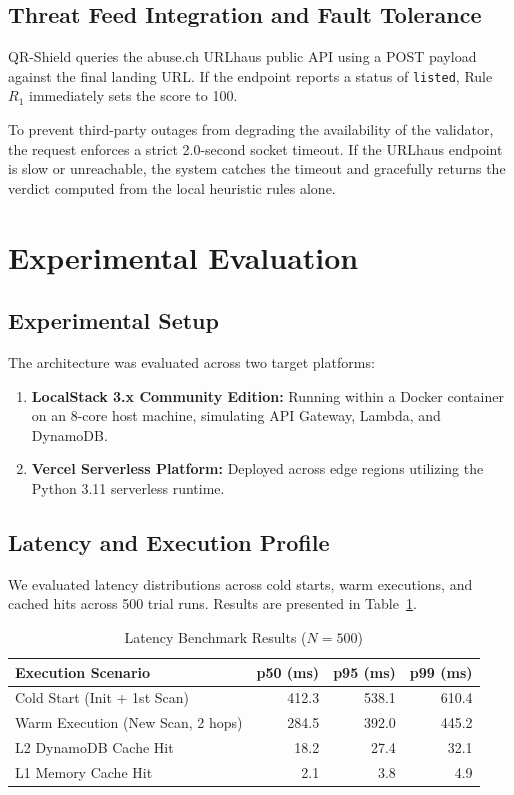\documentclass[10pt,conference,letterpaper]{IEEEtran}
\begin{document}
\subsection{Threat Feed Integration and Fault Tolerance}
QR-Shield queries the abuse.ch URLhaus public API using a POST payload against the final landing URL. If the endpoint reports a status of \texttt{listed}, Rule $R_1$ immediately sets the score to 100. 

To prevent third-party outages from degrading the availability of the validator, the request enforces a strict 2.0-second socket timeout. If the URLhaus endpoint is slow or unreachable, the system catches the timeout and gracefully returns the verdict computed from the local heuristic rules alone.

\section{Experimental Evaluation}

\subsection{Experimental Setup}
The architecture was evaluated across two target platforms:
\begin{enumerate}
    \item \textbf{LocalStack 3.x Community Edition:} Running within a Docker container on an 8-core host machine, simulating API Gateway, Lambda, and DynamoDB.
    \item \textbf{Vercel Serverless Platform:} Deployed across edge regions utilizing the Python 3.11 serverless runtime.
\end{enumerate}

\subsection{Latency and Execution Profile}
We evaluated latency distributions across cold starts, warm executions, and cached hits across 500 trial runs. Results are presented in Table~\ref{tab:benchmarks}.

\begin{table}[h]
\centering
\caption{Latency Benchmark Results ($N = 500$)}
\label{tab:benchmarks}
\begin{tabularx}{\linewidth}{X r r r}
\toprule
\textbf{Execution Scenario} & \textbf{p50 (ms)} & \textbf{p95 (ms)} & \textbf{p99 (ms)} \\
\midrule
Cold Start (Init + 1st Scan) & 412.3 & 538.1 & 610.4 \\
Warm Execution (New Scan, 2 hops) & 284.5 & 392.0 & 445.2 \\
L2 DynamoDB Cache Hit & 18.2 & 27.4 & 32.1 \\
L1 Memory Cache Hit & 2.1 & 3.8 & 4.9 \\
\bottomrule
\end{tabularx}
\end{table}
\end{document}
